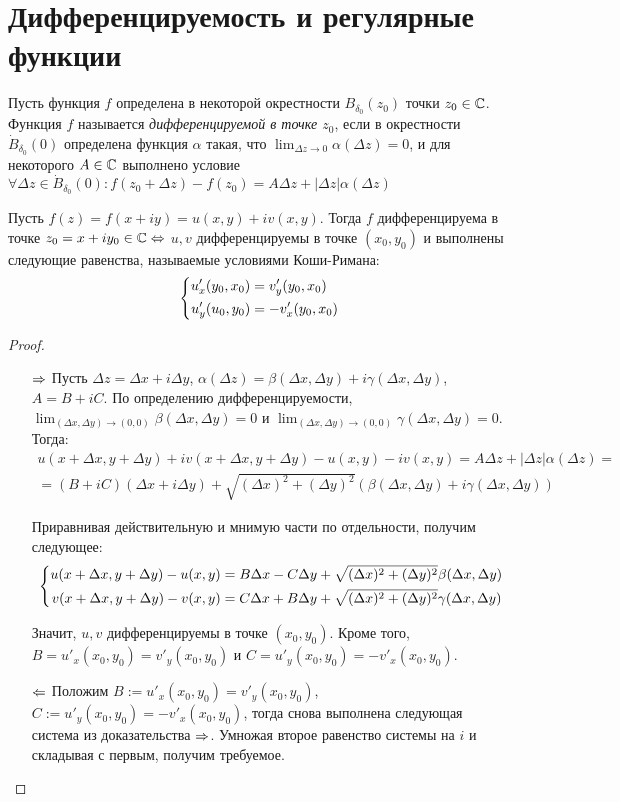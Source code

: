 \section{Дифференцируемость и регулярные функции}

\begin{definition}
	Пусть функция $f$ определена в некоторой окрестности $B_{\delta_0}(z_0)$ точки  $z_0 \in \mathbb{C}$. Функция $f$ называется \textit{дифференцируемой в точке $z_0$}, если в окрестности $\dot B_{\delta_0}{(0)}$ определена функция $\alpha$ такая, что $\lim_{\Delta z \to 0}\alpha(\Delta z) = 0$, и для некоторого $A \in \mathbb{C}$ выполнено условие $\forall \Delta z \in \dot B_{\delta_0}{(0)}: f(z_0 + \Delta z) - f(z_0) = A\Delta z + |\Delta z|\alpha(\Delta z)$
\end{definition}

\begin{theorem}
	Пусть $f(z) = f(x + iy) = u(x, y) + iv(x, y)$. Тогда $f$ дифференцируема в точке $z_0 = x + iy_0 \in \mathbb{C} \Leftrightarrow$ $u, v$ дифференцируемы в точке $(x_0, y_0)$ и выполнены следующие равенства, называемые условиями Коши-Римана:
	\[\left\{\begin{aligned}u'_x(y_0, x_0) &= v'_y(y_0, x_0) \\ u'_y(u_0, y_0) &= -v'_x(y_0, x_0)\end{aligned}\right.\]
\end{theorem}

\begin{proof}~
	\begin{itemize}
		\item[$\Rightarrow$] Пусть $\Delta z = \Delta x + i \Delta y$, $\alpha(\Delta z) = \beta(\Delta x, \Delta y) + i\gamma(\Delta x, \Delta y)$, $A = B + iC$. По определению дифференцируемости, $\lim_{(\Delta x, \Delta y) \to (0, 0)}\beta(\Delta x, \Delta y) = 0$ и $\lim_{(\Delta x, \Delta y) \to (0, 0)}\gamma(\Delta x, \Delta y) = 0$. Тогда:
		\begin{multline*}
			u(x + \Delta x, y + \Delta y) + iv(x + \Delta x, y + \Delta y) - u(x, y) - iv(x, y) =  A\Delta z + |\Delta z|\alpha(\Delta z) =
			\\
			= (B + iC)(\Delta x + i\Delta y) + \sqrt{(\Delta x)^2 + (\Delta y)^2}(\beta(\Delta x, \Delta y) + i\gamma(\Delta x, \Delta y))
		\end{multline*}
		
		Приравнивая действительную и мнимую части по отдельности, получим следующее:
		\[\left\{\begin{aligned}
			u(x + \Delta x, y + \Delta y) - u(x, y) &=  B\Delta x - C\Delta y + \sqrt{(\Delta x)^2 + (\Delta y)^2}\beta(\Delta x, \Delta y)
			\\
			v(x + \Delta x, y + \Delta y) - v(x, y) &= C\Delta x + B\Delta y + \sqrt{(\Delta x)^2 + (\Delta y)^2}\gamma(\Delta x, \Delta y)
		\end{aligned}\right.\]
	
		Значит, $u, v$ дифференцируемы в точке $(x_0, y_0)$. Кроме того, $B = u'_x(x_0, y_0) = v'_y(x_0, y_0)$ и $C = u'_y(x_0, y_0) = -v'_x(x_0, y_0)$.
		
		\item[$\Leftarrow$] Положим $B := u'_x(x_0, y_0) = v'_y(x_0, y_0)$, $C := u'_y(x_0, y_0) = -v'_x(x_0, y_0)$, тогда снова выполнена следующая система из доказательства $\Rightarrow$. Умножая второе равенство системы на $i$ и складывая с первым, получим требуемое.\qedhere
	\end{itemize}
\end{proof}

